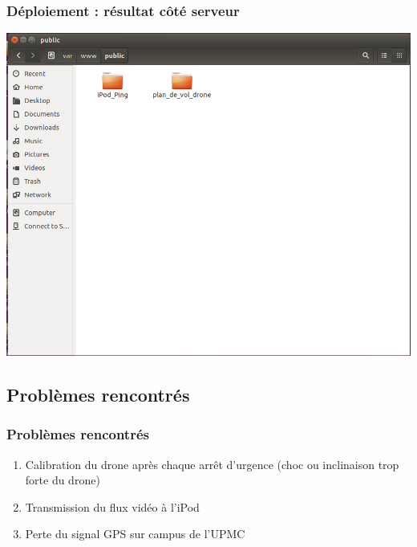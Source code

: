 \documentclass{beamer}
\begin{document}
	
	\begin{frame}
		\begin{center}
		\frametitle{Déploiement : résultat côté serveur}
        \includegraphics[scale=0.3]{result_deploiment_4.png}
		\end{center}
	\end{frame}




	
	\begin{frame}
	\section{Problèmes rencontrés}
		\begin{center}
		\frametitle{Problèmes rencontrés}
        \begin{enumerate}
            \item Calibration du drone après chaque arrêt d'urgence (choc ou inclinaison trop forte du drone)
            \item Transmission du flux vidéo à l'iPod
            \item Perte du signal GPS sur campus de l'UPMC
             \end{enumerate}
		\end{center}
	\end{frame}
\end{document}
